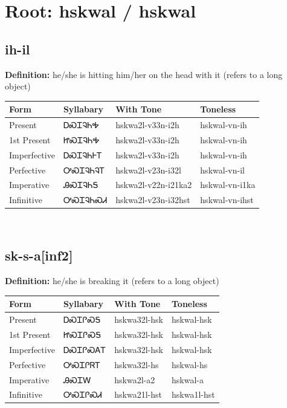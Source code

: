 \documentclass{article}%
\begin{document}
%
\normalsize%
\section*{Root: hskwal / hskwal}%
\subsection*{ih-il}%
\textbf{Definition: }%
he/she is hitting him/her on the head with it (refers to a long object)%
\\[0.5em]%
\begin{tabular}{|l|l|l|l|}%
\hline%
\textbf{Form}&\textbf{Syllabary}&\textbf{With Tone}&\textbf{Toneless}\\%
\hline%
Present&ᎠᏍᏆᎸᏂᎭ&hskwa2l{-}v33n{-}i2h&hskwal{-}vn{-}ih\\%
1st Present&ᏥᏍᏆᎸᏂᎭ&hskwa2l{-}v33n{-}i2h&hskwal{-}vn{-}ih\\%
Imperfective&ᎠᏍᏆᎸᏂᎰᎢ&hskwa2l{-}v33n{-}i2h&hskwal{-}vn{-}ih\\%
Perfective&ᎤᏍᏆᎸᏂᎸᎢ&hskwa2l{-}v23n{-}i32l&hskwal{-}vn{-}il\\%
Imperative&ᎯᏍᏆᎸᏂᎦ&hskwa2l{-}v22n{-}i21ka2&hskwal{-}vn{-}i1ka\\%
Infinitive&ᎤᏍᏆᎸᏂᏍᏗ&hskwa2l{-}v23n{-}i32hst&hskwal{-}vn{-}ihst\\%
\hline%
\end{tabular}%
\\[1em]%
\subsection*{sk-s-a[inf2]}%
\textbf{Definition: }%
he/she is breaking it (refers to a long object)%
\\[0.5em]%
\begin{tabular}{|l|l|l|l|}%
\hline%
\textbf{Form}&\textbf{Syllabary}&\textbf{With Tone}&\textbf{Toneless}\\%
\hline%
Present&ᎠᏍᏆᎵᏍᎦ&hskwa32l{-}hsk&hskwal{-}hsk\\%
1st Present&ᏥᏍᏆᎵᏍᎦ&hskwa32l{-}hsk&hskwal{-}hsk\\%
Imperfective&ᎠᏍᏆᎵᏍᎪᎢ&hskwa32l{-}hsk&hskwal{-}hsk\\%
Perfective&ᎤᏍᏆᎵᏒᎢ&hskwa32l{-}hs&hskwal{-}hs\\%
Imperative&ᎯᏍᏆᎳ&hskwa2l{-}a2&hskwal{-}a\\%
Infinitive&ᎤᏍᏆᎵᏍᏗ&hskwa21l{-}hst&hskwa1l{-}hst\\%
\hline%
\end{tabular}%
\\[1em]%
\end{document}
